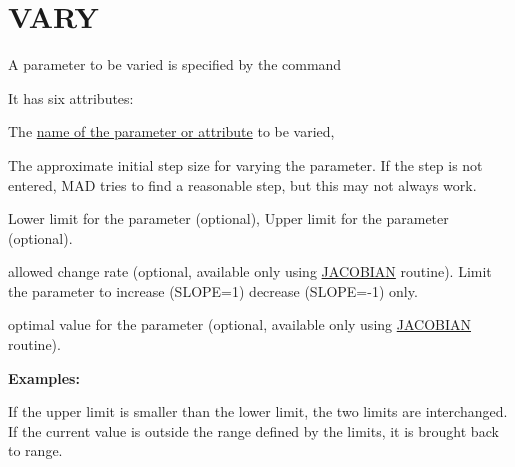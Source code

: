 

%
 
\section{VARY}
\label{sec:match_vary}
A parameter to be varied is specified by the command 


It has six attributes: 
\begin{madlist}
   The \href{../Introduction/variable.html}{name of the
    parameter or attribute} to be varied,  

   The approximate initial step size for varying the
  parameter. If the step is not entered, MAD tries to find a
  reasonable step, but this may not always work.  

   Lower limit for the parameter (optional), 
   Upper limit for the parameter (optional). 

   allowed change rate (optional, available only using
  \href{match_xeq.html#jacobian}{JACOBIAN} routine). Limit the
  parameter to increase (SLOPE=1) decrease (SLOPE=-1) only.  

   optimal value for the parameter (optional, available
  only using \href{match_xeq.html#jacobian}{JACOBIAN} routine).  
\end{madlist}

{\bf Examples:}

If the upper limit is smaller than the lower limit, the two limits are
interchanged. If the current value is outside the range defined by the
limits, it is brought back to range. 

